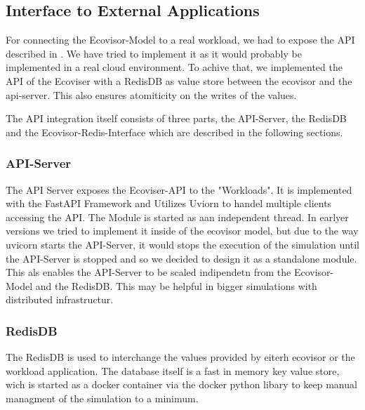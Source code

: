 \subsection{Interface to External Applications}

For connecting the Ecovisor-Model to a real workload, we had to expose the API described in \cite{souza2023}. We have tried to implement it as it would probably be implemented in a real cloud environment. %
To achive that, we implemented the API of the Ecoviser with a RedisDB as value store between the ecovisor and the api-server. This also ensures atomiticity on the writes of the values. %

The API integration itself consists of three parts, the API-Server, the RedisDB and the Ecovisor-Redis-Interface which are described in the following sections.



\subsubsection{API-Server}
The API Server exposes the Ecoviser-API to the "Workloads". It is implemented with the FastAPI Framework and Utilizes Uviorn to handel multiple clients accessing the API.
The Module is started as aan independent thread. In earlyer versions we tried to implement it inside of the ecovisor model, but due to the way uvicorn starts the API-Server,
it would stops the execution of the simulation until the API-Server is stopped and so we decided to design it as a standalone module. This als enables the API-Server to be scaled indipendetn from
the Ecovisor-Model and the RedisDB. This may be helpful in bigger simulations with distributed infrastructur.


\subsubsection{RedisDB}
The RedisDB is used to interchange the values provided by eiterh ecovisor or the workload application. The database itself is a fast in memory key value store, wich is started as a docker container via the docker python libary %
to keep manual managment of the simulation to a minimum.


